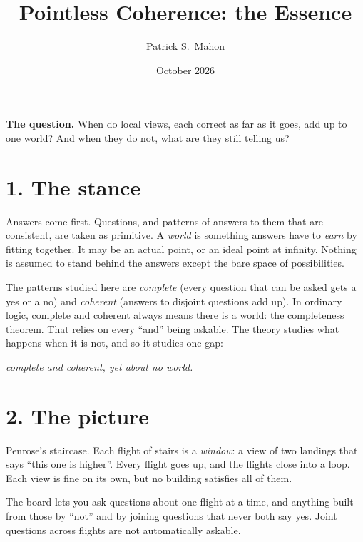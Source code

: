 \documentclass[11pt]{article}
\title{Pointless Coherence: the Essence}
\author{Patrick S.\ Mahon}
\date{October 2026}
\begin{document}
\maketitle

\begin{mdframed}[backgroundcolor=black!4,linewidth=0.4pt]
\textbf{The question.} When do local views, each correct as far as it goes, add
up to one world? And when they do not, what are they still telling us?
\end{mdframed}

\section*{1. The stance}
Answers come first. Questions, and patterns of answers to them that are
consistent, are taken as primitive. A \emph{world} is something answers have to
\emph{earn} by fitting together. It may be an actual point, or an ideal point at
infinity. Nothing is assumed to stand behind the answers except the bare space of
possibilities.

The patterns studied here are \emph{complete} (every question that can be asked
gets a yes or a no) and \emph{coherent} (answers to disjoint questions add up).
In ordinary logic, complete and coherent always means there is a world: the
completeness theorem. That relies on every ``and'' being askable. The theory
studies what happens when it is not, and so it studies one gap:
\begin{center}\emph{complete and coherent, yet about no world.}\end{center}

\section*{2. The picture}
Penrose's staircase. Each flight of stairs is a \emph{window}: a view of two
landings that says ``this one is higher''. Every flight goes up, and the
flights close into a loop. Each view is fine on its own, but no building
satisfies all of them.

The board lets you ask questions about one flight at a time, and anything built
from those by ``not'' and by joining questions that never both say yes.
Joint questions across flights are not automatically askable.
\end{document}
